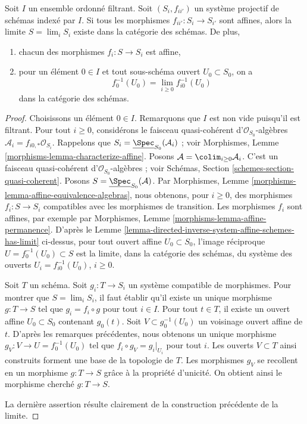 \begin{lemma}
\label{lemma-directed-inverse-system-has-limit}
Soit $I$ un ensemble ordonné filtrant. Soit $(S_i, f_{ii'})$ un système
projectif de schémas indexé par $I$. Si tous les morphismes
$f_{ii'} : S_i \to S_{i'}$ sont affines, alors la limite $S = \lim_i S_i$
existe dans la catégorie des schémas. De plus,
\begin{enumerate}
\item chacun des morphismes $f_i : S \to S_i$ est affine,
\item pour un élément $0 \in I$ et tout sous-schéma ouvert
$U_0 \subset S_0$, on a
$$
f_0^{-1}(U_0) = \lim_{i \geq 0} f_{i0}^{-1}(U_0)
$$
dans la catégorie des schémas.
\end{enumerate}
\end{lemma}

\begin{proof}
Choisissons un élément $0 \in I$. Remarquons que $I$ est non vide puisqu'il
est filtrant. Pour tout $i \geq 0$, considérons le faisceau quasi-cohérent
d'$\mathcal{O}_{S_0}$-algèbres
$\mathcal{A}_i = f_{i0, *}\mathcal{O}_{S_i}$. Rappelons que
$S_i = \underline{\Spec}_{S_0}(\mathcal{A}_i)$ ; voir Morphismes,
Lemme \ref{morphisms-lemma-characterize-affine}. Posons
$\mathcal{A} = \colim_{i \geq 0} \mathcal{A}_i$. C'est un faisceau
quasi-cohérent d'$\mathcal{O}_{S_0}$-algèbres ; voir Schémas,
Section \ref{schemes-section-quasi-coherent}. Posons
$S = \underline{\Spec}_{S_0}(\mathcal{A})$. Par Morphismes,
Lemme \ref{morphisms-lemma-affine-equivalence-algebras}, nous obtenons,
pour $i \geq 0$, des morphismes $f_i : S \to S_i$ compatibles avec les
morphismes de transition. Les morphismes $f_i$ sont affines, par exemple
par Morphismes, Lemme \ref{morphisms-lemma-affine-permanence}. D'après le
Lemme \ref{lemma-directed-inverse-system-affine-schemes-has-limit} ci-dessus,
pour tout ouvert affine $U_0 \subset S_0$, l'image réciproque
$U = f_0^{-1}(U_0) \subset S$ est la limite, dans la catégorie des schémas,
du système des ouverts $U_i = f_{i0}^{-1}(U_0)$, $i \geq 0$.

\medskip\noindent
Soit $T$ un schéma. Soit $g_i : T \to S_i$ un système compatible de
morphismes. Pour montrer que $S = \lim_i S_i$, il faut établir qu'il existe
un unique morphisme $g : T \to S$ tel que $g_i = f_i \circ g$ pour tout
$i \in I$. Pour tout $t \in T$, il existe un ouvert affine
$U_0 \subset S_0$ contenant $g_0(t)$. Soit
$V \subset g_0^{-1}(U_0)$ un voisinage ouvert affine de $t$.
D'après les remarques précédentes, nous obtenons un unique morphisme
$g_V : V \to U = f_0^{-1}(U_0)$ tel que $f_i \circ g_V = g_i|_{U_i}$
pour tout $i$. Les ouverts $V \subset T$ ainsi construits forment une base
de la topologie de $T$. Les morphismes $g_V$ se recollent en un morphisme
$g : T \to S$ grâce à la propriété d'unicité. On obtient ainsi le morphisme
cherché $g : T \to S$.

\medskip\noindent
La dernière assertion résulte clairement de la construction précédente de
la limite.
\end{proof}

